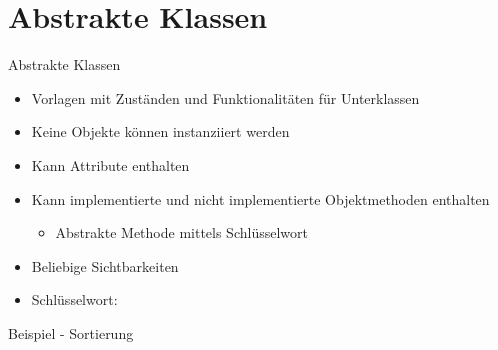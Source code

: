 \documentclass{../tuda-beamer}
\begin{document}
  \begin{frame}[c]
    
  \end{frame}

  \begin{frame}[c]
    
  \end{frame}

  \begin{frame}[c]
    
  \end{frame}

  \begin{frame}[c]
    
  \end{frame}


  \section{Abstrakte Klassen}
  \begin{frame}{Abstrakte Klassen}
    \begin{itemize}
      \item Vorlagen mit Zuständen und Funktionalitäten für Unterklassen
      \item Keine Objekte können instanziiert werden
      \item Kann Attribute enthalten
      \item Kann implementierte und nicht implementierte Objektmethoden enthalten
      \begin{itemize}
        \item Abstrakte Methode mittels Schlüsselwort 
      \end{itemize}
      \item Beliebige Sichtbarkeiten
      \item Schlüsselwort: 
    \end{itemize}
  \end{frame}

  \begin{frame}[c]{Beispiel - Sortierung}
    
  \end{frame}

  \begin{frame}[c]
    
  \end{frame}
\end{document}
